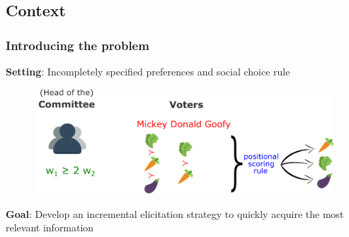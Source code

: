 \documentclass{beamer}
\begin{document}
\subsection{Context}


\begin{frame}
\frametitle{Introducing the problem}
\textbf{Setting}: Incompletely specified preferences and social choice rule \bigskip
{} \begin{figure}
	\includegraphics[scale=0.35]{ourset.png}
\end{figure}
 \textbf{Goal}: Develop an incremental elicitation strategy to quickly acquire the most relevant information 
\end{frame}
\end{document}
